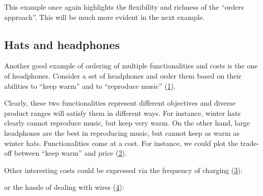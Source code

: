 This example once again highlights the flexibility and richness of the ``orders approach''.
This will be much more evident in the next example.


\subsection{Hats and headphones}
Another good example of ordering of multiple functionalities and costs is the one of headphones.
Consider a set of headphones and order them based on their abilities to ``keep warm'' and to ``reproduce music'' (\cref{fig:headpho_fun}).

\begin{figure}[h!]
    \centering
    \caption{}
    \label{fig:headpho_fun}
\end{figure}

Clearly, these two functionalities represent different objectives and diverse product ranges will satisfy them in different ways.
For instance, winter hats clearly cannot reproduce music, but keep very warm.
On the other hand, large headphones are the best in reproducing music, but cannot keep as warm as winter hats.
Functionalities come at a cost.
For instance, we could plot the trade-off between ``keep warm'' and price (\cref{fig:headpho_price}).

\begin{figure}[h!]
    \centering
    \caption{}
    \label{fig:headpho_price}
\end{figure}
\vfill
\clearpage

Other interesting costs could be expressed via the frequency of charging (\cref{fig:headpho_charge}):

\begin{figure}[h!
    ]
    \centering
    \caption{}
    \label{fig:headpho_charge}
\end{figure}

or the hassle of dealing with wires (\cref{fig:headpho_wires}):

\begin{figure}[h!]
    \centering
    \caption{}
    \label{fig:headpho_wires}
\end{figure}

